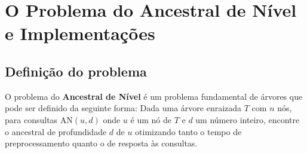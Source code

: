 

\newcommand{\sla}{\textbackslash}

\newcommand{\cmd}[1]{\textsf{#1}}

\newcommand{\pkg}[1]{\textsf{#1}}

\newcommand{\ltxcmd}[1]{\cmd{\sla{}#1}}

\chapter{O Problema do Ancestral de Nível e Implementações}
\label{chap:implementacoes}

\section{Definição do problema}
O problema do \textbf{Ancestral de Nível} é um problema fundamental de árvores que pode
ser definido da seguinte forma: Dada uma árvore enraizada $T$ com $n$ nós, para
consultas $\mathrm{AN}(u, d)$ onde $u$ é um nó de $T$ e $d$ um número inteiro,
encontre o ancestral de profundidade $d$ de $u$ otimizando tanto o tempo de
preprocessamento quanto o de resposta às consultas.


